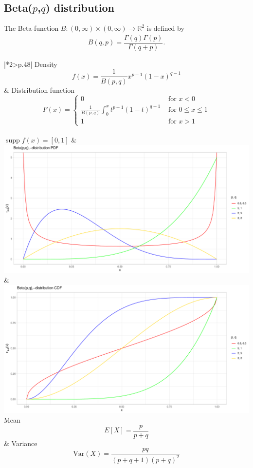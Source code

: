 \documentclass{article}
\DeclareMathOperator\supp{supp}
\begin{document}
	\newpage
	
	\subsection{Beta($p$,$q$) distribution}
	The Beta-function $B:\left( 0,\infty \right) \times \left( 0,\infty \right) \to \mathbb{R}^{2}$ is defined by
	\begin{align*}
		B\left( q,p\right) = \dfrac{\Gamma\left( q\right) \Gamma\left( p\right) }{\Gamma\left( q+p\right) }.
	\end{align*}
	\begin{tabular}{|*2{>{\centering\arraybackslash}p{}|}}
		\hline
		Density
		\[ f \left ( x \right ) = \frac{1}{B\left ( p,q \right )}x^{p-1}\left ( 1-x \right )^{q-1}
		\] 
		& Distribution function
		\[ F \left ( x \right ) = \left\{\begin{matrix}
			0 & \text{ for } x<0\\ 
			\frac{1}{B\left ( p,q \right )}\int_{0}^{x}t^{p-1}\left ( 1-t \right )^{q-1} & \text{ for } 0\leq x\leq 1\\ 
			1 & \text{ for } x> 1
		\end{matrix}\right. \]
		\\
		$\supp f\left( x\right) = \left[ 0,1\right] $ &
		\\
		\includegraphics[width=1.0\linewidth]{material/beta_PDF}
		\label{fig:rplot}
		&
		\includegraphics[width=1.0\linewidth]{material/beta_CDF}
		\label{fig:beta_CDF}
		\\
		\hline
		Mean
		\[ E\left [ X \right ] = \frac{p}{p+q} \]
		& Variance
		\[ \text{Var}\left( X\right) = \frac{pq}{\left( p+q+1\right) \left( p+q\right)^{2}} \]
		\\
	\end{tabular} \\
	
\end{document}
